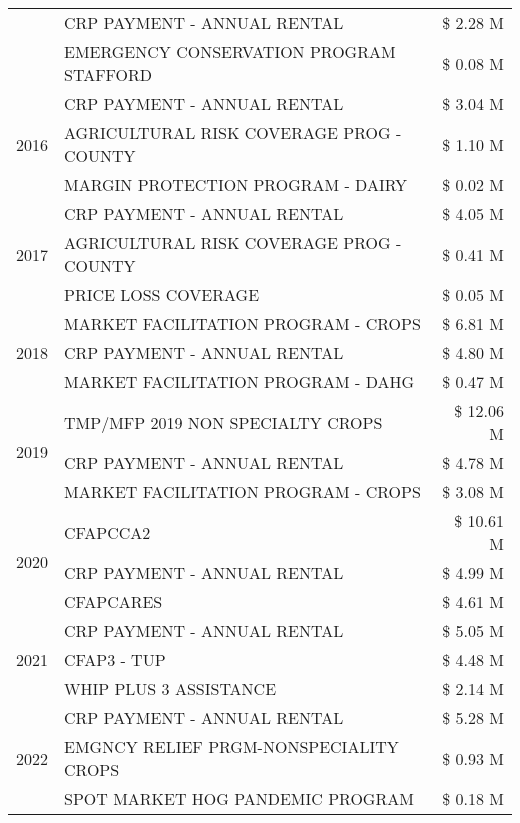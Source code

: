 \begin{tabular}{llr}
 & CRP PAYMENT - ANNUAL RENTAL & \$ 2.28 M \\
 & EMERGENCY CONSERVATION PROGRAM STAFFORD & \$ 0.08 M \\
\cline{1-3}
\multirow[t]{3}{*}{2016} & CRP PAYMENT - ANNUAL RENTAL & \$ 3.04 M \\
 & AGRICULTURAL RISK COVERAGE PROG - COUNTY & \$ 1.10 M \\
 & MARGIN PROTECTION PROGRAM - DAIRY & \$ 0.02 M \\
\cline{1-3}
\multirow[t]{3}{*}{2017} & CRP PAYMENT - ANNUAL RENTAL & \$ 4.05 M \\
 & AGRICULTURAL RISK COVERAGE PROG - COUNTY & \$ 0.41 M \\
 & PRICE LOSS COVERAGE & \$ 0.05 M \\
\cline{1-3}
\multirow[t]{3}{*}{2018} & MARKET FACILITATION PROGRAM - CROPS & \$ 6.81 M \\
 & CRP PAYMENT - ANNUAL RENTAL & \$ 4.80 M \\
 & MARKET FACILITATION PROGRAM - DAHG & \$ 0.47 M \\
\cline{1-3}
\multirow[t]{3}{*}{2019} & TMP/MFP 2019 NON SPECIALTY CROPS & \$ 12.06 M \\
 & CRP PAYMENT - ANNUAL RENTAL & \$ 4.78 M \\
 & MARKET FACILITATION PROGRAM - CROPS & \$ 3.08 M \\
\cline{1-3}
\multirow[t]{3}{*}{2020} & CFAPCCA2 & \$ 10.61 M \\
 & CRP PAYMENT - ANNUAL RENTAL & \$ 4.99 M \\
 & CFAPCARES & \$ 4.61 M \\
\cline{1-3}
\multirow[t]{3}{*}{2021} & CRP PAYMENT - ANNUAL RENTAL & \$ 5.05 M \\
 & CFAP3 - TUP & \$ 4.48 M \\
 & WHIP PLUS 3 ASSISTANCE & \$ 2.14 M \\
\cline{1-3}
\multirow[t]{3}{*}{2022} & CRP PAYMENT - ANNUAL RENTAL & \$ 5.28 M \\
 & EMGNCY RELIEF PRGM-NONSPECIALITY CROPS & \$ 0.93 M \\
 & SPOT MARKET HOG PANDEMIC PROGRAM & \$ 0.18 M \\
\cline{1-3}
\bottomrule
\end{tabular}
